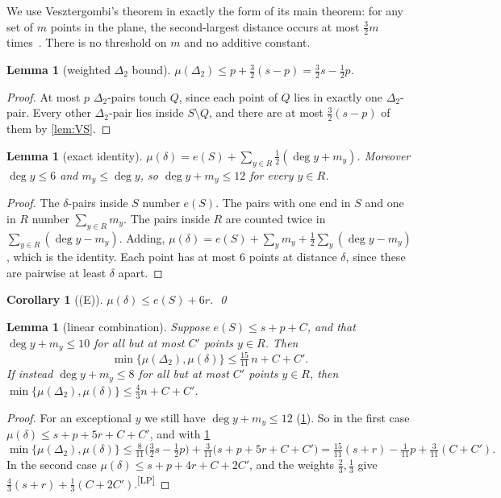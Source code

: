 \documentclass[11pt]{amsart}
\newtheorem{lemma}[theorem]{Lemma}
\newtheorem{corollary}[theorem]{Corollary}
\theoremstyle{definition}
\theoremstyle{remark}
\newcommand{\Dt}{\Delta_2}
\newcommand{\mult}{\mu}
\newcommand{\chk}[1]{\textsuperscript{[#1]}}
\begin{document}
We use Vesztergombi's theorem in exactly the form of its main theorem: for any set of $m$ points in the plane, the second-largest distance occurs at most $\frac32 m$ times~\cite[Theorem]{Ve87}. There is no threshold on $m$ and no additive constant.

\begin{lemma}[weighted $\Dt$ bound]\label{lem:VSQ}
$\mult(\Dt)\le p+\frac32(s-p)=\frac32s-\frac12p$.
\end{lemma}
\begin{proof}
At most $p$ $\Dt$-pairs touch $Q$, since each point of $Q$ lies in exactly one $\Dt$-pair. Every other $\Dt$-pair lies inside $S\setminus Q$, and there are at most $\frac32(s-p)$ of them by \cref{lem:VS}.
\end{proof}

\begin{lemma}[exact identity]\label{lem:identity}
$\mult(\delta)=e(S)+\sum_{y\in R}\tfrac12(\deg y+m_y)$. Moreover $\deg y\le 6$ and $m_y\le\deg y$, so $\deg y+m_y\le12$ for every $y\in R$.
\end{lemma}
\begin{proof}
The $\delta$-pairs inside $S$ number $e(S)$. The pairs with one end in $S$ and one in $R$ number $\sum_{y\in R}m_y$. The pairs inside $R$ are counted twice in $\sum_{y\in R}(\deg y-m_y)$. Adding, $\mult(\delta)=e(S)+\sum_ym_y+\frac12\sum_y(\deg y-m_y)$, which is the identity. Each point has at most $6$ points at distance $\delta$, since these are pairwise at least $\delta$ apart.
\end{proof}

\begin{corollary}[(E)]\label{lem:E}
$\mult(\delta)\le e(S)+6r$. \qed
\end{corollary}

\begin{lemma}[linear combination]\label{lem:lpnew}
Suppose $e(S)\le s+p+C$, and that $\deg y+m_y\le10$ for all but at most $C'$ points $y\in R$. Then
\[
\min\{\mult(\Dt),\mult(\delta)\}\le\tfrac{15}{11}\,n+C+C'.
\]
If instead $\deg y+m_y\le 8$ for all but at most $C'$ points $y\in R$, then $\min\{\mult(\Dt),\mult(\delta)\}\le\frac43n+C+C'$.
\end{lemma}
\begin{proof}
For an exceptional $y$ we still have $\deg y+m_y\le12$ (\cref{lem:identity}). So in the first case $\mult(\delta)\le s+p+5r+C+C'$, and with \cref{lem:VSQ}
\[
\min\{\mult(\Dt),\mult(\delta)\}\le\tfrac8{11}\bigl(\tfrac32s-\tfrac12p\bigr)+\tfrac3{11}\bigl(s+p+5r+C+C'\bigr)=\tfrac{15}{11}(s+r)-\tfrac1{11}p+\tfrac3{11}(C+C').
\]
In the second case $\mult(\delta)\le s+p+4r+C+2C'$, and the weights $\frac23,\frac13$ give $\frac43(s+r)+\frac13(C+2C')$.\chk{LP}
\end{proof}
\end{document}
